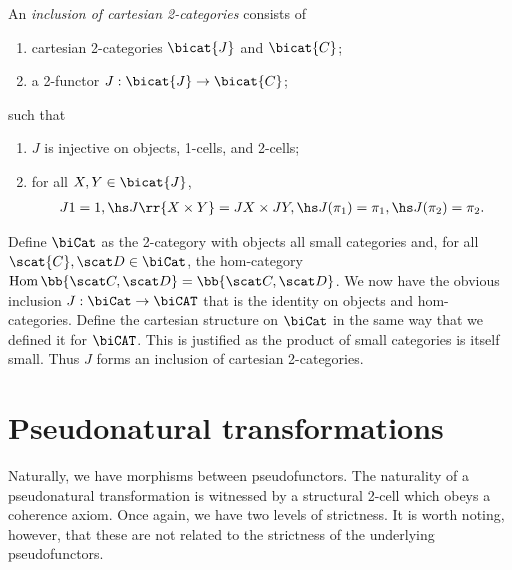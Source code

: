 \begin{definition}
  An \emph{inclusion of cartesian 2-categories} consists of
  \begin{enumerate}
    \item cartesian 2-categories $\bicat{J}$ and $\bicat{C}$;
    \item a 2-functor $J:\bicat{J}\to\bicat{C}$;
  \end{enumerate}
  such that
  \begin{enumerate}
    \item $J$ is injective on objects, 1-cells, and 2-cells;
    \item for all $X,Y\in\bicat{J}$,
      \begin{align*}
        J1=1,\hs
        J\rr{X\times Y}=JX\times JY,\hs
        J(\pi_1) = \pi_1,\hs J(\pi_2)=\pi_2.
      \end{align*}
  \end{enumerate}
\end{definition}

\begin{example}
  Define $\biCat$ as the 2-category with objects all small categories and, for all
  $\scat{C},\scat D\in\biCat$, the hom-category $\Hom\bb{\scat C,\scat D}=\bb{\scat C,\scat D}$.
  We now have the obvious inclusion $J:\biCat\to\biCAT$ that is the identity
  on objects and hom-categories. Define the cartesian structure
  on $\biCat$ in the same way that we defined it for $\biCAT$. This is justified as the
  product of small categories is itself small. Thus $J$ forms an inclusion of cartesian
  2-categories.
\end{example}

\section{Pseudonatural transformations}

Naturally, we have morphisms between pseudofunctors. The naturality of a
pseudonatural transformation is witnessed by a structural 2-cell which obeys a
coherence axiom. Once again, we have two levels of strictness. It is worth
noting, however, that these are not related to the strictness of the underlying
pseudofunctors.

